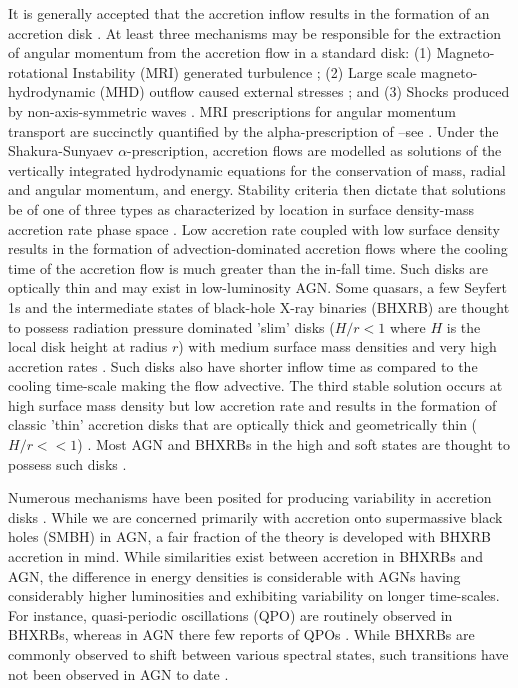 \documentclass[a4paper,fleqn,usenatbib]{mnras}
\begin{document}
It is generally accepted that the accretion inflow results in the formation of an accretion disk \citep*{KoratkarBlaes99,PringleARAA}. At least three mechanisms may be responsible for the extraction of angular momentum from the accretion flow in a standard disk: (1) Magneto-rotational Instability (MRI) generated turbulence \citep*{BHI,BHRev}; (2) Large scale magneto-hydrodynamic (MHD) outflow caused external stresses \citep*{BlandfordPayne82}; and (3) Shocks produced by non-axis-symmetric waves \citep{FragileBlaes08}. MRI prescriptions for angular momentum transport are succinctly quantified by the alpha-prescription of \citet{ShakuraSunyaev73}--see \citet{BalbusPapaloizou99}. Under the Shakura-Sunyaev $\alpha$-prescription, accretion flows are modelled as solutions of the vertically integrated hydrodynamic equations for the conservation of mass, radial and angular momentum, and energy. Stability criteria then dictate that solutions be of one of three types as characterized by location in surface density-mass accretion rate phase space \citep{BlaesAccretion}. Low accretion rate coupled with low surface density results in the formation of advection-dominated accretion flows \citep{NarayanYi94,ChenAbramowicz95} where the cooling time of the accretion flow is much greater than the in-fall time. Such disks are optically thin and may exist in low-luminosity AGN. Some quasars, a few Seyfert 1s and the intermediate states of black-hole X-ray binaries (BHXRB) are thought to possess radiation pressure dominated 'slim' disks ($H/r < 1$ where $H$ is the local disk height at radius $r$) with medium surface mass densities and very high accretion rates \citep{Abramowicz88}. Such disks also have shorter inflow time as compared to the cooling time-scale making the flow advective. The third stable solution occurs at high surface mass density but low accretion rate and results in the formation of classic 'thin' accretion disks that are optically thick and geometrically thin ($H/r << 1$) \citep*{ShakuraSunyaev73,FKR}. Most AGN and BHXRBs in the high and soft states are thought to possess such disks \citep{BlaesAccretion}.

Numerous mechanisms have been posited for producing variability in accretion disks \citep{DoneAccretion,MaccaroneAccretion, UttleyAccretion}. While we are concerned primarily with accretion onto supermassive black holes (SMBH) in AGN, a fair fraction of the theory is developed with BHXRB accretion in mind. While similarities exist between accretion in BHXRBs and AGN, the difference in energy densities is considerable with AGNs having considerably higher luminosities and exhibiting variability on longer time-scales. For instance, quasi-periodic oscillations (QPO) are routinely observed in BHXRBs, whereas in AGN there few reports of QPOs \citep{GierlinskiQPO,GrindleyQPO}. While BHXRBs are commonly observed to shift between various spectral states, such transitions have not been observed in AGN to date \citep{Kelly11}.
\end{document}
